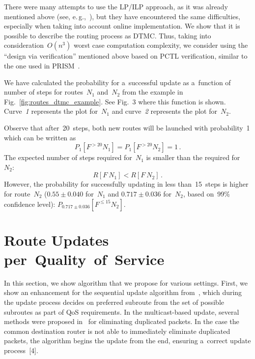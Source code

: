 \begin{multicols}{2}
There were many attempts to use the LP/ILP 
approach, as it was already mentioned above (see, e.\,g.,~\cite{juttner_lagrange_2001}), 
but they have encountered the same difficulties, especially when taking 
into account online implementation. We show that it is possible to describe 
the routing process as DTMC. Thus, taking into consideration~$O(n^3)$ worst case 
computation complexity, we consider using the ``design via verification'' 
mentioned above based on PCTL verification, similar to the one used in 
PRISM~\cite{kwiatkowska_prism_2011}.


We have calculated the probability for a~successful update as a~function of 
number of steps for routes~$N_1$ and~$N_2$ from the example in 
Fig.~\ref{fig:routes_dtmc_example}. See Fig.~3 
where this function is shown. Curve~\textit{1}
represents the plot for~$N_1$ and curve~\textit{2} represents
 the plot for~$N_2$. 

Observe that after~20~steps, both new routes will be launched with probability~1 
which can be written as 
$$
P_{1}\left[F^{>20}N_1\right]=P_{1}\left[F^{>20}N_2\right]=1\,.
$$
The expected number of steps required for~$N_1$ is smaller than the required for~$N_2$:
$$
R \left[F~N_1\right] < R \left[F~N_2\right]\,.
$$
However, the probability for successfully updating in less than~15~steps 
is higher for route~$N_2$ ($0.55 \pm 0.040$ for~$N_1$ and 
$0.717 \pm 0.036$ for~$N_2$, based on~99\% confidence level):
$P_{0.717 \pm 0.036}\left[F^{\leq 15} N_2 \right].$

\vspace*{-6pt}


\section{Route Updates per~Quality~of~Service}
\label{sec:updates_qos}

\vspace*{-2pt}

\noindent
In this section, we show algorithm that we propose for various settings. 
First, we show an enhancement for the sequential update algorithm 
from~\cite{delaet_seamless_2015}, which during the update process decides on 
preferred subroute from the set of possible subroutes as part of QoS requirements. 
In the multicast-based update, several methods were proposed 
in~\cite{delaet_seamless_2015} for eliminating duplicated packets. 
In the case the common destination router is not able to immediately eliminate 
duplicated packets, the algorithm begins the update from the end, 
ensuring a~correct update process~[4].




\end{multicols}
